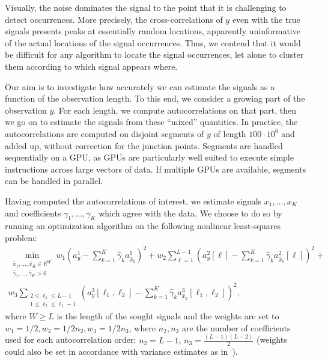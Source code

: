 \documentclass[12pt]{article}
\newcommand{\1}{\mathbf{1}}
\newcommand{\R}{\mathbb{R}}
\theoremstyle{plain}
\theoremstyle{definition}
\theoremstyle{remark}
\theoremstyle{plain}
\theoremstyle{remark}
\theoremstyle{plain}
\theoremstyle{plain}
\theoremstyle{plain}
\numberwithin{equation}{section}
\begin{document}
Visually, the noise dominates the signal to the point that it is challenging to detect occurrences. More precisely, the cross-correlations of $y$ even with the true signals presents peaks at essentially random locations, apparently uninformative of the actual locations of the signal occurrences. Thus, we contend that it would be difficult for any algorithm to locate the signal occurrences, let alone to cluster them according to which signal appears where.

Our aim is to investigate how accurately we can estimate the signals as a function of the observation length. To this end, we consider a growing part of the observation $y$. For each length, we compute autocorrelations on that part, then we go on to estimate the signals from these ``mixed'' quantities. In practice, the autocorrelations are computed on disjoint segments of $y$ of length $100\cdot10^6$ and added up, without correction for the junction points. Segments are handled sequentially on a GPU, as GPUs are particularly well suited to execute simple instructions across large vectors of data. If multiple GPUs are available, segments can  be handled in parallel.


Having computed the autocorrelations of interest, we estimate signals $x_1, \ldots, x_K$ and coefficients $\gamma_1, \ldots, \gamma_K$ which agree with the data. We choose to do so by running an optimization algorithm on the following nonlinear least-squares problem:
\begin{multline}
	\min_{\substack{\hat x_1, \ldots, \hat x_K \in \R^{W} \\ \hat \gamma_1, \ldots, \hat \gamma_K > 0}} w_1 \left( a_y^1 - \sum_{k=1}^K \hat \gamma_k a_{\hat x_k}^1 \right)^2 + w_2 \sum_{\ell = 1}^{L-1} \left( a_y^2[\ell] - \sum_{k=1}^K \hat \gamma_k a_{\hat x_k}^2[\ell] \right)^2 + \\ w_3 \sum_{\substack{2\leq\ell_1\leq L-1 \\ 1 \leq \ell_2 \leq \ell_1-1}} \left( a_y^3[\ell_1, \ell_2] - \sum_{k=1}^K \hat \gamma_k a_{\hat x_k}^3[\ell_1,\ell_2] \right)^2,
	\label{eq:optim1D}
\end{multline}
where $W \geq L$ is the length of the sought signals and the weights are set to $w_1 = 1/2, w_2 = 1/2n_2, w_3 = 1/2n_3$, where $n_2, n_3$ are the number of coefficients used for each autocorrelation order: $n_2 = L-1$, $n_3 = \frac{(L-1)(L-2)}{2}$ (weights could also be set in accordance with variance estimates as in~\cite{boumal2017heterogeneous}).
\end{document}

